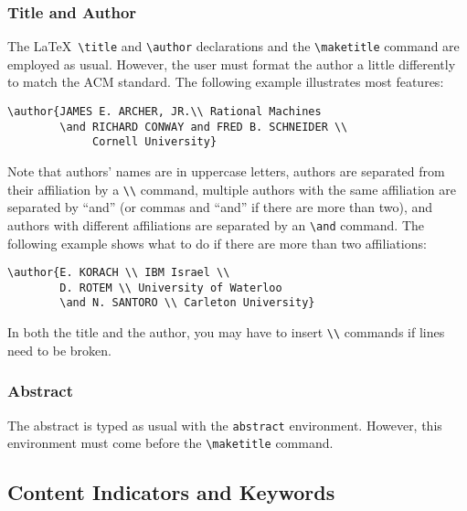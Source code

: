 \subsubsection{Title and Author}
The \LaTeX\ \verb|\title| and \verb|\author| declarations and the
\verb|\maketitle| command are employed as usual.  However, the user
must format the author a little differently to match the ACM standard.
The following example \cite{6:1(1)} illustrates most features:
\begin{verbatim}
\author{JAMES E. ARCHER, JR.\\ Rational Machines
        \and RICHARD CONWAY and FRED B. SCHNEIDER \\ 
             Cornell University}
\end{verbatim}
Note that authors' names are in uppercase letters, authors are
separated from their affiliation by a \verb|\\| command, multiple
authors with the same affiliation are separated by ``and'' (or commas
and ``and'' if there are more than two), and authors with different
affiliations are separated by an \verb|\and| command.  The following
example \cite{6:3(380)} shows what to do if there are more than
two affiliations:
\begin{verbatim}
\author{E. KORACH \\ IBM Israel \\
        D. ROTEM \\ University of Waterloo
        \and N. SANTORO \\ Carleton University}
\end{verbatim}
In both the title and the author, you may have to insert \verb|\\|
commands if lines need to be broken. 

\subsubsection{Abstract}
The abstract is typed as usual with the {\tt abstract} environment.
However, this environment must come before the \verb|\maketitle|
command.

\subsection{Content Indicators and Keywords}

